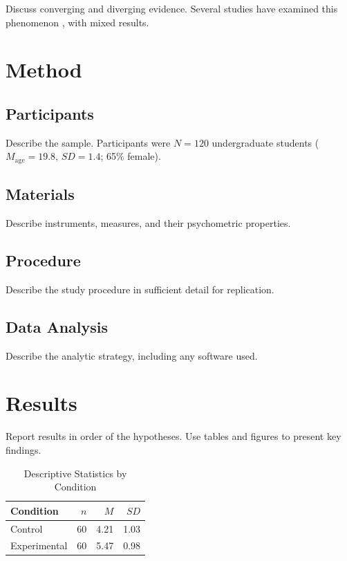 \documentclass[man]{apa7}
\begin{document}
Discuss converging and diverging evidence. Several studies have
examined this phenomenon \parencite{other2021,diff2022}, with
mixed results.

\section{Method}

\subsection{Participants}

Describe the sample. Participants were $N = 120$ undergraduate
students ($M_{\text{age}} = 19.8$, $SD = 1.4$; 65\% female).

\subsection{Materials}

Describe instruments, measures, and their psychometric properties.

\subsection{Procedure}

Describe the study procedure in sufficient detail for replication.

\subsection{Data Analysis}

Describe the analytic strategy, including any software used.

\section{Results}

Report results in order of the hypotheses. Use tables and figures
to present key findings.

\begin{table}[ht]
  \caption{Descriptive Statistics by Condition}
  \label{tab:descriptives}
  \begin{tabular}{lrrr}
    \toprule
    Condition & $n$ & $M$ & $SD$ \\
    \midrule
    Control       & 60 & 4.21 & 1.03 \\
    Experimental  & 60 & 5.47 & 0.98 \\
    \bottomrule
  \end{tabular}
\end{table}
\end{document}
